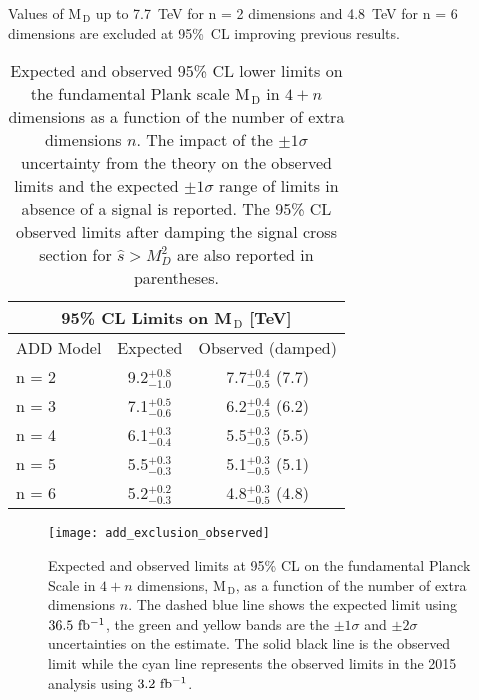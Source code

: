 Values of M$_\mathrm{\, D}$ up to 7.7~TeV for n = 2 dimensions and 4.8~TeV for n
= 6 dimensions are excluded at 95\%~CL improving previous results.
\begin{table}[!hb]
  \centering
  \begin{tabular}{lcc}
    \toprule
    \multicolumn{3}{c}{95\% CL Limits on M$_\mathrm{\, D}$
    [TeV]} \\
    \midrule \midrule
    ADD Model & Expected & Observed (damped) \\
    \midrule
    n = 2 & 9.2$^{+0.8}_{-1.0}$ & 7.7$^{+0.4}_{-0.5}$ (7.7) \B \\
    n = 3 & 7.1$^{+0.5}_{-0.6}$ & 6.2$^{+0.4}_{-0.5}$ (6.2) \T \B \\
    n = 4 & 6.1$^{+0.3}_{-0.4}$ & 5.5$^{+0.3}_{-0.5}$ (5.5) \T \B \\
    n = 5 & 5.5$^{+0.3}_{-0.3}$ & 5.1$^{+0.3}_{-0.5}$ (5.1) \T \B \\
    n = 6 & 5.2$^{+0.2}_{-0.3}$ & 4.8$^{+0.3}_{-0.5}$ (4.8) \T \\
    \bottomrule
  \end{tabular}
  \caption{Expected and observed 95\% CL lower limits on the fundamental Plank
      scale M$_\mathrm{\, D}$ in $4 + n$ dimensions as a function of the number
      of extra dimensions $n$. The impact of the $\pm 1 \sigma$ uncertainty from
      the theory on the observed limits and the expected $\pm 1 \sigma$ range of
      limits in absence of a signal is reported. The 95\% CL observed limits
      after damping the signal cross section for $\hat{s} > M_D^2$ are also
      reported in parentheses.}
  \label{tab:add_limits}
\end{table}
\begin{figure}
  \centering
  \texttt{[image: add\_exclusion\_observed]}
  \caption{Expected and observed limits at 95\% CL on the fundamental Planck
    Scale in $4 + n$ dimensions, M$_\mathrm{\, D}$, as a function of the number
    of extra dimensions $n$. The dashed blue line shows the expected limit using
    $36.5~\mbox{fb$^{-1}$}$, the green and yellow bands are the $\pm 1 \sigma$ and
    $\pm 2 \sigma$ uncertainties on the estimate. The solid black line is the
    observed limit while the cyan line represents the observed limits in the
    2015 analysis using $3.2~\mbox{fb$^{-1}$}$.}
  \label{fig:add_observed}
\end{figure}
